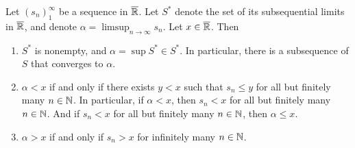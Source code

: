 \documentclass[12pt]{article} %
\begin{document}
\begin{theorem}
    Let $(s_n)_1^\infty$ be a sequence in $\overline{\mathbb{R}}$. Let $S^*$ denote the set of its subsequential limits in $\overline{\mathbb{R}}$, and denote $\alpha = \limsup_{n \to \infty} s_n$. Let $x \in \overline{\mathbb{R}}$. Then \begin{enumerate}
        \item $S^*$ is nonempty, and $\alpha = \sup S^* \in S^*$. In particular, there is a subsequence of $S$ that converges to $\alpha$.
        \item $\alpha < x$ if and only if there exists $y < x$ such that $s_n \leq y$ for all but finitely many $n \in \mathbb{N}$. In particular, if $\alpha < x$, then $s_n < x$ for all but finitely many $n \in \mathbb{N}$. And if $s_n < x$ for all but finitely many $n \in \mathbb{N}$, then $\alpha \leq x$.
        \item $\alpha > x$ if and only if $s_n > x$ for infinitely many $n \in \mathbb{N}$.
    \end{enumerate}
\end{theorem}
\end{document}
